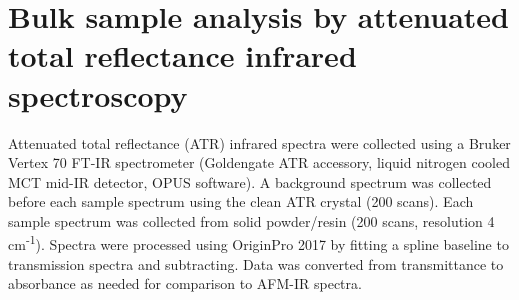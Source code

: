 \section[Bulk sample analysis by ATR FT-IR]{Bulk sample analysis by attenuated total reflectance infrared spectroscopy}
\label{section2.5}

Attenuated total reflectance (ATR) infrared spectra were collected using a Bruker Vertex 70 FT-IR spectrometer (Goldengate ATR accessory, liquid nitrogen cooled MCT mid-IR detector, OPUS software). A background spectrum was collected before each sample spectrum using the clean ATR crystal (200 scans). Each sample spectrum was collected from solid powder/resin (200 scans, resolution 4 cm\textsuperscript{-1}). Spectra were processed using OriginPro 2017 by fitting a spline baseline to transmission spectra and subtracting. Data was converted from transmittance to absorbance as needed for comparison to AFM-IR spectra.


